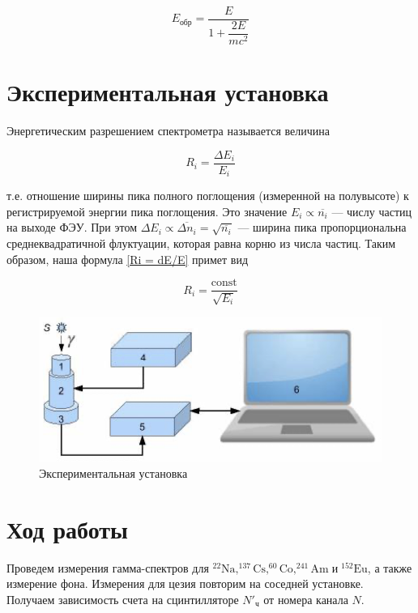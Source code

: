 \documentclass[12pt,a4paper]{article}
\begin{document}
\begin{equation}\label{Eobr}
	E_{\text{обр}} = \dfrac{E}{1 + \dfrac{2E}{mc^2}}
\end{equation}
 	
 
\section*{Экспериментальная установка}
	
Энергетическим разрешением спектрометра называется величина
	
\begin{equation}\label{Ri = dE/E}
	R_i = \dfrac{\Delta E_i}{E_i}
\end{equation}
	
т.е. отношение ширины пика полного поглощения (измеренной на полувысоте) к регистрируемой энергии пика поглощения. Это значение $ E_i \propto \overline{n_i} $ --- числу частиц на выходе ФЭУ. При этом  $ \Delta E_i \propto \overline{\Delta n_i} = \sqrt{\overline{n_i}} $ --- ширина пика пропорциональна среднеквадратичной флуктуации, которая равна корню из числа частиц. Таким образом, наша формула \eqref{Ri = dE/E} примет вид
	
\begin{equation}\label{Ri = c/E}
	R_i = \dfrac{\mathrm{const}}{\sqrt{E_i}}
\end{equation}

\begin{figure}[h!]
    \centering
 	\includegraphics[width=\linewidth]{res/scheme.png}
 	\caption{Экспериментальная установка}
 	\label{Scheme_Compton}
\end{figure}

\section*{Ход работы}

Проведем измерения гамма-спектров для $ \mathrm{^{22}Na, ^{137}Cs, ^{60}Co, ^{241}Am \;} \text{и} \mathrm{\; ^{152}Eu}$, а также измерение фона. Измерения для цезия повторим на соседней установке. Получаем зависимость счета на сцинтилляторе $ N'_\text{ч} $ от номера канала $ N $. 
	
\end{document}
